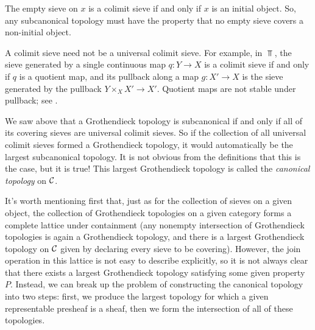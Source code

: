 \startlecture[Oct 1, 2026]

\begin{example}\label{example:chap:sheaves:sec:sites:empty sieve}
    The empty sieve on $x$ is a colimit sieve if and only if $x$ is an initial object. So, any subcanonical topology must have the property that no empty sieve covers a non-initial object.
\end{example}

\begin{remark}\label{remark:chap:sheaves:sec:sites:colimit sieves need not be universal}
    A colimit sieve need not be a universal colimit sieve. For example, in $\Top$, the sieve generated by a single continuous map $q : Y \to X$ is a colimit sieve if and only if $q$ is a quotient map, and its pullback along a map $g : X' \to X$ is the sieve generated by the pullback $Y \times_X X' \to X'$. Quotient maps are not stable under pullback; see .
\end{remark}

We saw above that a Grothendieck topology is subcanonical if and only if all of its covering sieves are universal colimit sieves. So if the collection of all universal colimit sieves formed a Grothendieck topology, it would automatically be the largest subcanonical topology. It is not obvious from the definitions that this is the case, but it is true! This largest Grothendieck topology is called the \emph{canonical topology} on $\mathcal{C}$.

It's worth mentioning first that, just as for the collection of sieves on a given object, the collection of Grothendieck topologies on a given category forms a complete lattice under containment (any nonempty intersection of Grothendieck topologies is again a Grothendieck topology, and there is a largest Grothendieck topology on $\mathcal{C}$ given by declaring every sieve to be covering). However, the join operation in this lattice is not easy to describe explicitly, so it is not always clear that there exists a largest Grothendieck topology satisfying some given property $P$. Instead, we can break up the problem of constructing the canonical topology into two steps: first, we produce the largest topology for which a given representable presheaf is a sheaf, then we form the intersection of all of these topologies.


